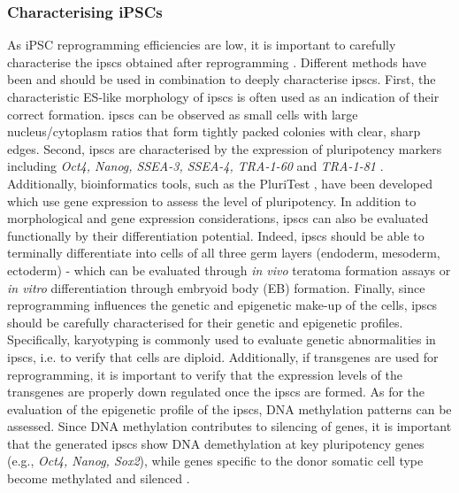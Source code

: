 \subsubsection{Characterising iPSCs}

As iPSC reprogramming efficiencies are low, it is important to carefully characterise the \glspl{ipsc} obtained after reprogramming \cite{brouwer2016choices}.
Different methods have been and should be used in combination to deeply characterise \glspl{ipsc}. 
First, the characteristic ES-like morphology of \glspl{ipsc} is often used as an indication of their correct formation. 
\glspl{ipsc} can be observed as small cells with large nucleus/cytoplasm ratios that form tightly packed colonies with clear, sharp edges. 
Second, \glspl{ipsc} are characterised by the expression of pluripotency markers including \textit{Oct4, Nanog, SSEA-3, SSEA-4, TRA-1-60} and \textit{TRA-1-81} \cite{boulting2011functionally}.
Additionally, bioinformatics tools, such as the PluriTest \cite{muller2011bioinformatic}, have been developed which use gene expression to assess the level of pluripotency. 
In addition to morphological and gene expression considerations, \glspl{ipsc} can also be evaluated functionally by their differentiation potential.
Indeed, \glspl{ipsc} should be able to terminally differentiate into cells of all three germ layers (endoderm, mesoderm, ectoderm) - which can be evaluated through \textit{in vivo} teratoma formation assays or \textit{in vitro} differentiation through embryoid body (EB) formation.
Finally, since reprogramming influences the genetic and epigenetic make-up of the cells, \glspl{ipsc} should be carefully characterised for their genetic and epigenetic profiles.
Specifically, karyotyping is commonly used to evaluate genetic abnormalities in \glspl{ipsc}, i.e. to verify that cells are diploid. 
Additionally, if transgenes are used for reprogramming, it is important to verify that the expression levels of the transgenes are properly down regulated once the \glspl{ipsc} are formed. 
As for the evaluation of the epigenetic profile of the \glspl{ipsc}, DNA methylation patterns can be assessed. 
Since DNA methylation contributes to silencing of genes, it is important that the generated \glspl{ipsc} show DNA demethylation at key pluripotency genes (e.g., \textit{Oct4, Nanog, Sox2}), while genes specific to the donor somatic cell type become methylated and silenced \cite{brouwer2016choices, omole2018ten}. 

